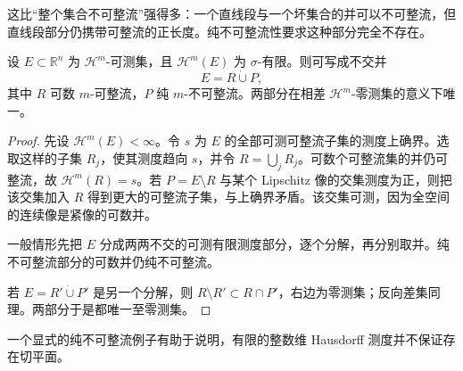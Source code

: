 这比“整个集合不可整流”强得多：一个直线段与一个坏集合的并可以不可整流，但直线段部分仍携带可整流的正长度。纯不可整流性要求这种部分完全不存在。

\begin{theorem}\label{g3:thm:rectifiable-pure-decomposition}
	设 \(E\subset\mathbb R^n\) 为 \(\mathcal H^m\)-可测集，且 \(\mathcal H^m(E)\) 为 \(\sigma\)-有限。则可写成不交并
	\[
		E=R\mathbin{\dot\cup}P,
	\]
	其中 \(R\) 可数 \(m\)-可整流，\(P\) 纯 \(m\)-不可整流。两部分在相差 \(\mathcal H^m\)-零测集的意义下唯一。
\end{theorem}
\begin{proof}
	先设 \(\mathcal H^m(E)<\infty\)。令 \(s\) 为 \(E\) 的全部可测可整流子集的测度上确界。选取这样的子集 \(R_j\)，使其测度趋向 \(s\)，并令 \(R=\bigcup_jR_j\)。可数个可整流集的并仍可整流，故 \(\mathcal H^m(R)=s\)。若 \(P=E\setminus R\) 与某个 Lipschitz 像的交集测度为正，则把该交集加入 \(R\) 得到更大的可整流子集，与上确界矛盾。该交集可测，因为全空间的连续像是紧像的可数并。

	一般情形先把 \(E\) 分成两两不交的可测有限测度部分，逐个分解，再分别取并。纯不可整流部分的可数并仍纯不可整流。

	若 \(E=R'\mathbin{\dot\cup}P'\) 是另一个分解，则 \(R\setminus R'\subset R\cap P'\)，右边为零测集；反向差集同理。两部分于是都唯一至零测集。
\end{proof}

一个显式的纯不可整流例子有助于说明，有限的整数维 Hausdorff 测度并不保证存在切平面。

